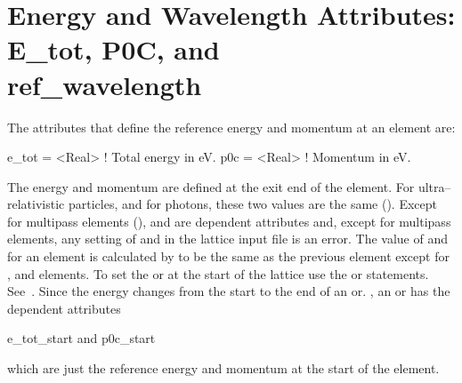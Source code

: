 \section[Energy and Wavelength Attributes]{Energy and Wavelength Attributes: E_tot, P0C, and \\ ref_wavelength }
\label{s:energy}
The attributes that define the reference energy and momentum at an element are:
\begin{example}
  e_tot  = <Real>  ! Total energy in eV.
  p0c    = <Real>  ! Momentum in eV.
\end{example}
The energy and momentum are defined at the exit end of the element.
For ultra--relativistic particles, and for photons, these two values
are the same (). Except for multipass elements
(),  and  are dependent attributes
and, except for multipass elements, any setting of  and
 in the lattice input file is an error. The value of
 and  for an element is calculated by \bmad to be
the same as the previous element except for ,  and
 elements. To set the  or  at the start of
the lattice use the  or  statements.
See~. Since the energy changes from the start to the end
of an  or. , an  or  has
the dependent attributes
\begin{example}
  e_tot_start   and
  p0c_start
\end{example}
which are just the reference energy and momentum at the start of the element.

